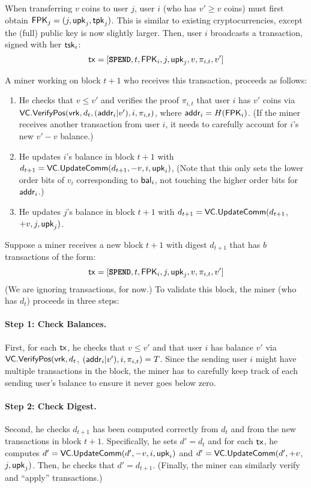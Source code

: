 When transferring $v$ coins to user $j$, user $i$ (who has $v'\ge v$ coins) must first obtain $\mathbf{\mathsf{FPK}}_j=(j, \mathsf{upk}_j,\mathsf{tpk}_j)$.
This is similar to existing cryptocurrencies, except the (full) public key is now slightly larger.
Then, user $i$ broadcasts a \spendtxn transaction, signed with her $\mathsf{tsk}_i$:
$$\mathsf{tx}=[\texttt{\textbf{SPEND}}, t, \mathbf{\mathsf{FPK}}_i, j, \mathsf{upk}_j, v,\pi_{i,t}, v']$$

A miner working on block ${t+1}$ who receives this \spendtxn transaction, proceeds as follows:
\begin{enumerate}
\item He checks that $v\le v'$ and verifies the proof $\pi_{i,t}$ that user $i$ has $v'$ coins via $\mathsf{VC}.\mathsf{VerifyPos}(\mathsf{vrk}, d_t, (\mathsf{addr}_i|v'), i, \pi_{i,t})$, where $\mathsf{addr}_i=H(\mathbf{\mathsf{FPK}}_i)$.
(If the miner receives another transaction from user $i$, it needs to carefully account for $i$'s new $v'-v$ balance.)
\item He updates $i$'s balance in block $t+1$ with $d_{t+1}=\mathsf{VC}.\mathsf{UpdateComm}(d_{t+1}, -v, i, \mathsf{upk}_i)$,
(Note that this only sets the lower order bits of $v_i$ corresponding to $\mathsf{bal}_i$, not touching the higher order bits for $\mathsf{addr}_i$.)
\item He updates $j$'s balance in block $t+1$ with $d_{t+1}=\mathsf{VC}.\mathsf{UpdateComm}(d_{t+1}$, $+v, j, \mathsf{upk}_j)$.
\end{enumerate}

Suppose a miner receives a new block $t+1$ with digest $d_{t+1}$ that has $b$ transactions of the form:
$$\mathsf{tx}=[\texttt{\textbf{SPEND}}, t, \mathbf{\mathsf{FPK}}_{i}, {j}, \mathsf{upk}_{j}, v, \pi_{i,t}, v']$$
(We are ignoring \inittxn transactions, for now.)
To validate this block, the miner (who has $d_t$) proceeds in three steps:

\paragraph{Step 1: Check Balances.}
First, for each $\mathsf{tx}$, he checks that $v \le v'$ and that user $i$ has balance $v'$ via $\mathsf{VC}.\mathsf{VerifyPos}(\mathsf{vrk}, d_t$, $(\mathsf{addr}_{i}|v'), i, \pi_{i,t})=T$.
Since the sending user $i$ might have multiple transactions in the block, the miner has to carefully keep track of each sending user's balance to ensure it never goes below zero.

\paragraph{Step 2: Check Digest.}
Second, he checks $d_{t+1}$ has been computed correctly from $d_t$ and from the new transactions in block $t+1$.
Specifically, he sets $d'=d_t$ and for each $\mathsf{tx}$, he computes $d' = \mathsf{VC}.\mathsf{UpdateComm}(d', -v, i, \mathsf{upk}_{i})$ and $d'=\mathsf{VC}.\mathsf{UpdateComm}(d',+v$, $j,\mathsf{upk}_{j})$.
Then, he checks that $d'=d_{t+1}$.
(Finally, the miner can similarly verify and ``apply'' \inittxn transactions.)

